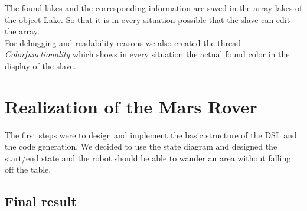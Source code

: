 \documentclass[11pt,a4paper]{article}
\begin{document}
The found lakes and the corresponding information are saved in the array lakes of the object Lake. So that it is in every situation possible that the slave can edit the array. \\

For debugging and readability reasons we also created the thread \emph{Colorfunctionality} which shows in every situation the actual found color in the display of the slave.  
  



\section*{Realization of the Mars Rover}
The first steps were to design and implement the basic structure of the DSL and the code generation. We decided to use the state diagram and designed the start/end state and the robot should be able to wander an area without falling off the table. 

\subsection*{Final result}
\end{document}
